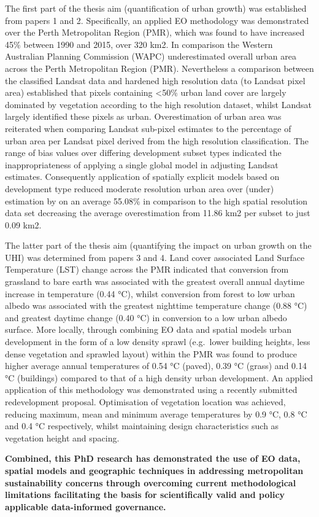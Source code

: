\documentclass[]{book}
\begin{document}
The first part of the thesis aim (quantification of urban growth) was
established from papers 1 and 2. Specifically, an applied EO methodology
was demonstrated over the Perth Metropolitan Region (PMR), which was
found to have increased 45\% between 1990 and 2015, over 320 km2. In
comparison the Western Australian Planning Commission (WAPC)
underestimated overall urban area across the Perth Metropolitan Region
(PMR). Nevertheless a comparison between the classified Landsat data and
hardened high resolution data (to Landsat pixel area) established that
pixels containing \textless{}50\% urban land cover are largely dominated
by vegetation according to the high resolution dataset, whilst Landsat
largely identified these pixels as urban. Overestimation of urban area
was reiterated when comparing Landsat sub-pixel estimates to the
percentage of urban area per Landsat pixel derived from the high
resolution classification. The range of bias values over differing
development subset types indicated the inappropriateness of applying a
single global model in adjusting Landsat estimates. Consequently
application of spatially explicit models based on development type
reduced moderate resolution urban area over (under) estimation by on an
average 55.08\% in comparison to the high spatial resolution data set
decreasing the average overestimation from 11.86 km2 per subset to just
0.09 km2.

The latter part of the thesis aim (quantifying the impact on urban
growth on the UHI) was determined from papers 3 and 4. Land cover
associated Land Surface Temperature (LST) change across the PMR
indicated that conversion from grassland to bare earth was associated
with the greatest overall annual daytime increase in temperature (0.44
°C), whilst conversion from forest to low urban albedo was associated
with the greatest nighttime temperature change (0.88 °C) and greatest
daytime change (0.40 °C) in conversion to a low urban albedo surface.
More locally, through combining EO data and spatial models urban
development in the form of a low density sprawl (e.g.~lower building
heights, less dense vegetation and sprawled layout) within the PMR was
found to produce higher average annual temperatures of 0.54 °C (paved),
0.39 °C (grass) and 0.14 °C (buildings) compared to that of a high
density urban development. An applied application of this methodology
was demonstrated using a recently submitted redevelopment proposal.
Optimisation of vegetation location was achieved, reducing maximum, mean
and minimum average temperatures by 0.9 °C, 0.8 °C and 0.4 °C
respectively, whilst maintaining design characteristics such as
vegetation height and spacing.

\textbf{Combined, this PhD research has demonstrated the use of EO data,
spatial models and geographic techniques in addressing metropolitan
sustainability concerns through overcoming current methodological
limitations facilitating the basis for scientifically valid and policy
applicable data-informed governance. }


\end{document}
